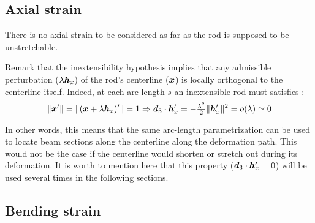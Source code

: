 \subsection{Axial strain}
There is no axial strain to be considered as far as the rod is supposed to be unstretchable.

Remark that the inextensibility hypothesis implies that any admissible perturbation ($\lambda\boldsymbol{h}_x$) of the rod's centerline ($\boldsymbol{x}$) is locally orthogonal to the centerline itself. Indeed, at each arc-length $s$ an inextensible rod must satisfies :
\begin{equation}\label{eq:3_6}
	\|\boldsymbol{x}'\| = \|(\boldsymbol{x}+\lambda\boldsymbol{h}_x)'\| = 1 \Rightarrow \boldsymbol{d}_3 \cdot \boldsymbol{h}'_x = -\tfrac{\lambda^2}{2}\|\boldsymbol{h}'_x\|^2 = o(\lambda) \simeq 0
\end{equation}

In other words, this means that the same arc-length parametrization can be used to locate beam sections along the centerline along the deformation path. This would not be the case if the centerline would shorten or stretch out during its deformation. It is worth to mention here that this property ($\boldsymbol{d}_3 \cdot \boldsymbol{h}'_x = 0$) will be used several times in the following sections.

\subsection{Bending strain}

